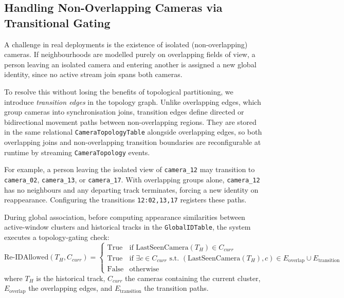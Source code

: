 \documentclass[review]{elsarticle}
\begin{document}
\subsection{Handling Non-Overlapping Cameras via Transitional Gating}
\label{sec:multi:transition}
A challenge in real deployments is the existence of isolated (non-overlapping) cameras. If neighbourhoods are modelled purely on overlapping fields of view, a person leaving an isolated camera and entering another is assigned a new global identity, since no active stream join spans both cameras.

To resolve this without losing the benefits of topological partitioning, we introduce \emph{transition edges} in the topology graph. Unlike overlapping edges, which group cameras into synchronisation joins, transition edges define directed or bidirectional movement paths between non-overlapping regions. They are stored in the same relational \texttt{CameraTopologyTable} alongside overlapping edges, so both overlapping joins and non-overlapping transition boundaries are reconfigurable at runtime by streaming \texttt{CameraTopology} events.

For example, a person leaving the isolated view of \texttt{camera\_12} may transition to \texttt{camera\_02}, \texttt{camera\_13}, or \texttt{camera\_17}. With overlapping groups alone, \texttt{camera\_12} has no neighbours and any departing track terminates, forcing a new identity on reappearance. Configuring the transitions \texttt{12:02,13,17} registers these paths.

During global association, before computing appearance similarities between active-window clusters and historical tracks in the \texttt{GlobalIDTable}, the system executes a topology-gating check:
\begin{equation}
    \text{Re-IDAllowed}(T_H, C_{curr}) = \begin{cases}
        \text{True} & \text{if } \text{LastSeenCamera}(T_H) \in C_{curr} \\
        \text{True} & \text{if } \exists c \in C_{curr} \text{ s.t. } (\text{LastSeenCamera}(T_H), c) \in E_{\text{overlap}} \cup E_{\text{transition}} \\
        \text{False} & \text{otherwise}
    \end{cases}
\end{equation}
where $T_H$ is the historical track, $C_{curr}$ the cameras containing the current cluster, $E_{\text{overlap}}$ the overlapping edges, and $E_{\text{transition}}$ the transition paths.
\end{document}
